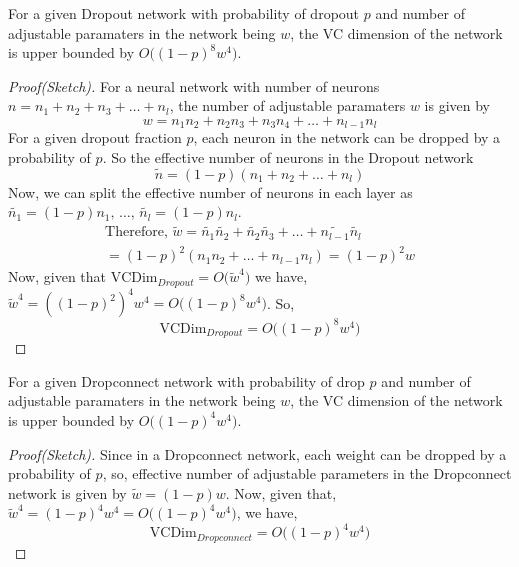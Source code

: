 \documentclass[11pt,a4paper]{article}
\begin{document}
\begin{theorem}\label{Theorem:vc_dropout}
For a given Dropout network with probability of dropout $p$ and number of adjustable paramaters in the network being $w$, the VC dimension of the network is upper bounded by $O\Big((1-p)^8w^4\Big)$.
\end{theorem}
\begin{proof}[Proof(Sketch)] For a neural network with number of neurons $n = n_1 + n_2 + n_3 + \ldots + n_l$, the number of adjustable paramaters $w$ is given by
\begin{equation}
w = n_1n_2 + n_2n_3 + n_3n_4 + \ldots + n_{l-1}n_l
\end{equation}
For a given dropout fraction $p$, each neuron in the network can be dropped by a probability of $p$. So the effective number of neurons in the Dropout network
\begin{equation}
\widetilde{n} = (1-p)(n_1 + n_2 + \ldots + n_l)
\end{equation} 
Now, we can split the effective number of neurons in each layer as
$\widetilde{n_1} = (1-p)n_1 \text{,   } \ldots \text{,   } \widetilde{n_l} = (1-p)n_l$.
\begin{multline}
\text{Therefore, } \widetilde{w} = \widetilde{n_1} \widetilde{n_2} + \widetilde{n_2} \widetilde{n_3} + \ldots + \widetilde{n_{l-1}} \widetilde{n_{l}} \\
= (1-p)^2(n_1 n_2 + \ldots + n_{l-1} n_{l}) = (1-p)^2w
\end{multline} 
Now, given that $\text{VCDim}_{Dropout} = O\Big({\widetilde{w}}^4\Big)$ we have,
$ {\widetilde{w}}^4 =  ((1-p)^2)^4w^4 = O\Big((1-p)^8w^4\Big)$.
So,
\begin{equation}\label{Eq:vc_dropout}
\text{VCDim}_{Dropout} = O\Big((1-p)^8w^4\Big)
\end{equation} 
\end{proof}

\begin{theorem}\label{Theorem:vc_dropconnect}
For a given Dropconnect network with probability of drop $p$ and number of adjustable paramaters in the network being $w$, the VC dimension of the network is upper bounded by $O\Big((1-p)^4w^4\Big)$.
\end{theorem}
\begin{proof}[Proof(Sketch)] Since in a Dropconnect network, each weight can be dropped by a probability of $p$, so, effective number of adjustable parameters in the Dropconnect network is given by $\widetilde{w} = (1-p)w$.
Now, given that,
${\widetilde{w}}^4 =  (1-p)^4w^4 = O\Big((1-p)^4w^4\Big)$, we have,
\begin{equation}\label{Eq:vc_dropconnect}
\text{VCDim}_{Dropconnect} = O\Big((1-p)^4w^4\Big)
\end{equation} 
\end{proof}
\end{document}

